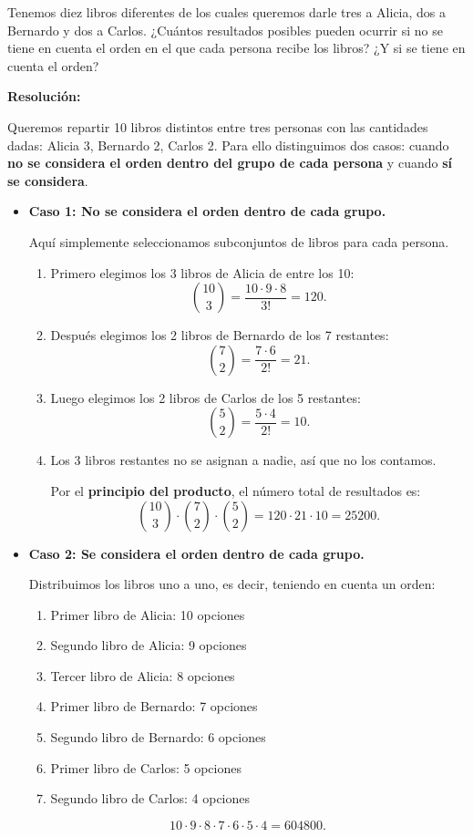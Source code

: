 \documentclass[a4paper,12pt]{article}
\begin{document}
\begin{ejercicio}[title=Ejercicio 17]
Tenemos diez libros diferentes de los cuales queremos darle tres a Alicia, dos a Bernardo y dos a Carlos. ¿Cuántos resultados posibles pueden ocurrir si no se tiene en cuenta el orden en el que cada persona recibe los libros? ¿Y si se tiene en cuenta el orden?

\tcblower
\textbf{Resolución:}

Queremos repartir 10 libros distintos entre tres personas con las cantidades dadas: Alicia 3, Bernardo 2, Carlos 2.  
Para ello distinguimos dos casos: cuando \textbf{no se considera el orden dentro del grupo de cada persona} y cuando \textbf{sí se considera}.

\begin{itemize}
\item \textbf{Caso 1: No se considera el orden dentro de cada grupo.}  

Aquí simplemente seleccionamos subconjuntos de libros para cada persona.

\begin{enumerate}
\item Primero elegimos los 3 libros de Alicia de entre los 10: 
\[
\binom{10}{3} = \frac{10\cdot 9\cdot 8}{3!} = 120.
\]

\item Después elegimos los 2 libros de Bernardo de los 7 restantes: 
\[
\binom{7}{2} = \frac{7\cdot 6}{2!} = 21.
\]

\item Luego elegimos los 2 libros de Carlos de los 5 restantes: 
\[
\binom{5}{2} = \frac{5\cdot 4}{2!} = 10.
\]

\item Los 3 libros restantes no se asignan a nadie, así que no los contamos.  

Por el \textbf{principio del producto}, el número total de resultados es:
\[
\binom{10}{3} \cdot \binom{7}{2} \cdot \binom{5}{2} = 120 \cdot 21 \cdot 10 = \boxed{25200}.
\]
\end{enumerate}

\item \textbf{Caso 2: Se considera el orden dentro de cada grupo.}  

Distribuimos los libros uno a uno, es decir, teniendo en cuenta un orden:

\begin{enumerate}
\item Primer libro de Alicia: 10 opciones  
\item Segundo libro de Alicia: 9 opciones  
\item Tercer libro de Alicia: 8 opciones  
\item Primer libro de Bernardo: 7 opciones  
\item Segundo libro de Bernardo: 6 opciones  
\item Primer libro de Carlos: 5 opciones  
\item Segundo libro de Carlos: 4 opciones
\end{enumerate}
\[
10 \cdot 9 \cdot 8 \cdot 7 \cdot 6 \cdot 5 \cdot 4 = \boxed{604800}.
\]
\end{itemize}
\end{ejercicio}
\end{document}
